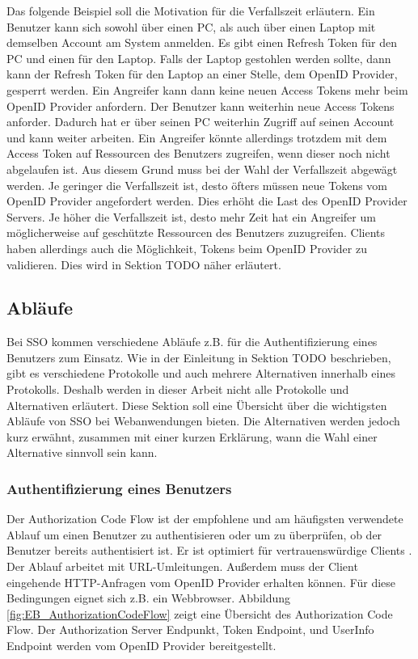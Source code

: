 Das folgende Beispiel soll die Motivation für die Verfallszeit erläutern. Ein Benutzer kann sich sowohl über einen PC, als auch über einen Laptop mit demselben Account am System anmelden. Es gibt einen Refresh Token für den PC und einen für den Laptop. Falls der Laptop gestohlen werden sollte, dann kann der Refresh Token für den Laptop an einer Stelle, dem OpenID Provider, gesperrt werden. Ein Angreifer kann dann keine neuen Access Tokens mehr beim OpenID Provider anfordern. Der Benutzer kann weiterhin neue Access Tokens anforder. Dadurch hat er über seinen PC weiterhin Zugriff auf seinen Account und kann weiter arbeiten. Ein Angreifer könnte allerdings trotzdem mit dem Access Token auf Ressourcen des Benutzers zugreifen, wenn dieser noch nicht abgelaufen ist. Aus diesem Grund muss bei der Wahl der Verfallszeit abgewägt werden. Je geringer die Verfallszeit ist, desto öfters müssen neue Tokens vom OpenID Provider angefordert werden. Dies erhöht die Last des OpenID Provider Servers. Je höher die Verfallszeit ist, desto mehr Zeit hat ein Angreifer um möglicherweise auf geschützte Ressourcen des Benutzers zuzugreifen. Clients haben allerdings auch die Möglichkeit, Tokens beim OpenID Provider zu validieren. Dies wird in Sektion TODO näher erläutert.

\subsection{Abläufe} \label{EB_Abläufe}

Bei SSO kommen verschiedene Abläufe z.B. für die Authentifizierung eines Benutzers zum Einsatz. Wie in der Einleitung in Sektion TODO beschrieben, gibt es verschiedene Protokolle und auch mehrere Alternativen innerhalb eines Protokolls. Deshalb werden in dieser Arbeit nicht alle Protokolle und Alternativen erläutert. Diese Sektion soll eine Übersicht über die wichtigsten Abläufe von SSO bei Webanwendungen bieten. Die Alternativen werden jedoch kurz erwähnt, zusammen mit einer kurzen Erklärung, wann die Wahl einer Alternative sinnvoll sein kann.

\subsubsection{Authentifizierung eines Benutzers} \label{EB_Authentifizierung_eines_Benutzers}

Der Authorization Code Flow ist der empfohlene und am häufigsten verwendete Ablauf um einen Benutzer zu authentisieren oder um zu überprüfen, ob der Benutzer bereits authentisiert ist. Er ist optimiert für vertrauenswürdige Clients \cite{EB13}. Der Ablauf arbeitet mit URL-Umleitungen. Außerdem muss der Client eingehende HTTP-Anfragen vom OpenID Provider erhalten können. Für diese Bedingungen eignet sich z.B. ein Webbrowser. Abbildung \ref{fig:EB_AuthorizationCodeFlow} zeigt eine Übersicht des Authorization Code Flow. Der Authorization Server Endpunkt, Token Endpoint, und UserInfo Endpoint werden vom OpenID Provider bereitgestellt.

